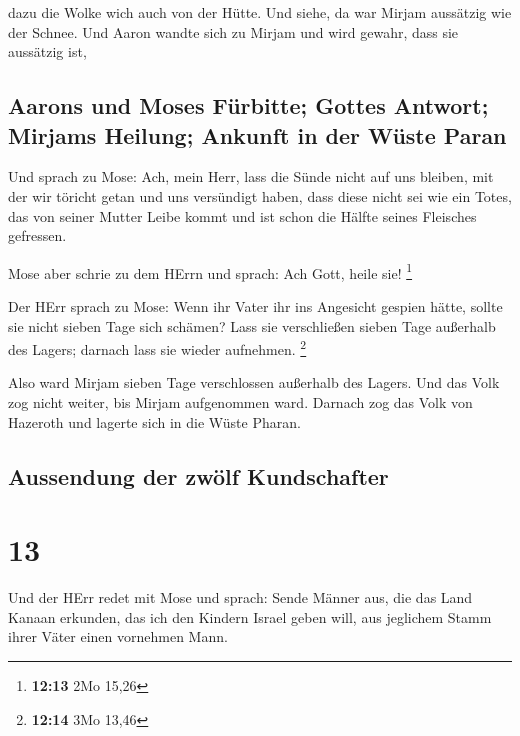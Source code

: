  dazu die Wolke wich auch von der Hütte. Und siehe, da
war Mirjam aussätzig wie der Schnee. Und Aaron wandte sich zu Mirjam und
wird gewahr, dass sie aussätzig ist,

\hypertarget{aarons-und-moses-fuxfcrbitte-gottes-antwort-mirjams-heilung-ankunft-in-der-wuxfcste-paran}{%
\subsection{Aarons und Moses Fürbitte; Gottes Antwort; Mirjams Heilung;
Ankunft in der Wüste
Paran}\label{aarons-und-moses-fuxfcrbitte-gottes-antwort-mirjams-heilung-ankunft-in-der-wuxfcste-paran}}

 Und sprach zu Mose: Ach, mein Herr, lass die Sünde nicht
auf uns bleiben, mit der wir töricht getan und uns versündigt haben,
 dass diese nicht sei wie ein Totes, das von seiner
Mutter Leibe kommt und ist schon die Hälfte seines Fleisches gefressen.

 Mose aber schrie zu dem HErrn und sprach: Ach Gott,
heile sie! \footnote{\textbf{12:13} 2Mo 15,26}

 Der HErr sprach zu Mose: Wenn ihr Vater ihr ins
Angesicht gespien hätte, sollte sie nicht sieben Tage sich schämen? Lass
sie verschließen sieben Tage außerhalb des Lagers; darnach lass sie
wieder aufnehmen. \footnote{\textbf{12:14} 3Mo 13,46}

 Also ward Mirjam sieben Tage verschlossen außerhalb des
Lagers. Und das Volk zog nicht weiter, bis Mirjam aufgenommen ward.
 Darnach zog das Volk von Hazeroth und lagerte sich in
die Wüste Pharan.

\hypertarget{aussendung-der-zwuxf6lf-kundschafter}{%
\subsection{Aussendung der zwölf
Kundschafter}\label{aussendung-der-zwuxf6lf-kundschafter}}

\hypertarget{section-12}{%
\section{13}\label{section-12}}

 Und der HErr redet mit Mose und sprach: 
Sende Männer aus, die das Land Kanaan erkunden, das ich den Kindern
Israel geben will, aus jeglichem Stamm ihrer Väter einen vornehmen Mann.

